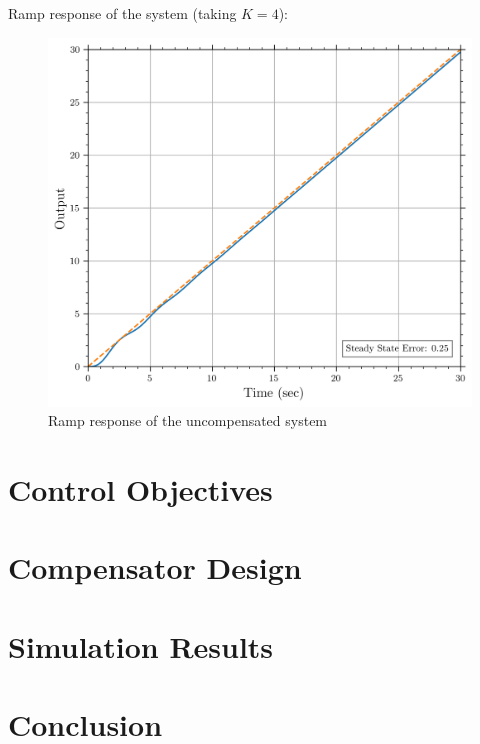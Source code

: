 \documentclass[12pt]{article}
\begin{document}
Ramp response of the system (taking $K=4$):
\begin{figure}[h!]
    \centering
    \includegraphics[width=0.7\linewidth]{ramp_response_uncompensated.png}
    \caption {Ramp response of the uncompensated system}
    \label{fig:ramp_uncompensated}
\end{figure}

\clearpage
\section{Control Objectives}
\section{Compensator Design}
\section{Simulation Results}
\section{Conclusion}
\end{document}
